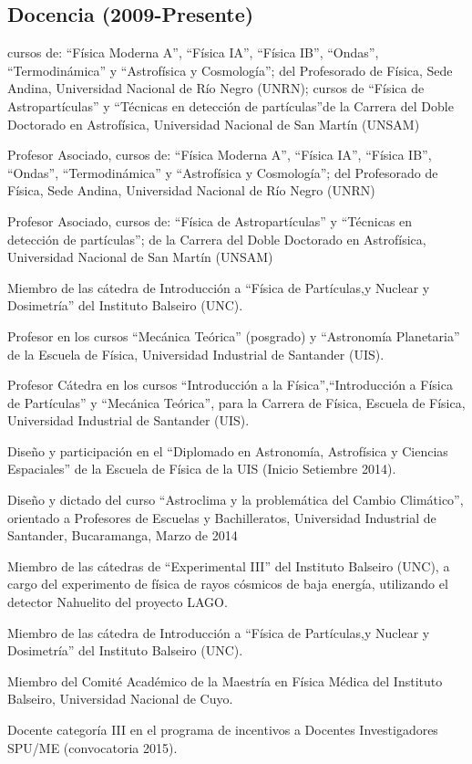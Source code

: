 \subsection*{Docencia (2009-Presente)}
\begin{description}
\ifres
	\item [Profesor Asociado] cursos de: ``Física Moderna A'', ``Física IA'', ``Física IB'', ``Ondas'', ``Termodinámica'' y ``Astrofísica y Cosmología''; del Profesorado de Física, Sede Andina, Universidad Nacional de Río Negro (UNRN); cursos de ``Física de Astropartículas'' y ``Técnicas en detección de partículas''de la Carrera del Doble Doctorado en Astrofísica, Universidad Nacional de San Martín (UNSAM)
\else
	\item [2015-presente] Profesor Asociado, cursos de: ``Física Moderna A'', ``Física IA'', ``Física IB'',  ``Ondas'', ``Termodinámica'' y ``Astrofísica y Cosmología''; del Profesorado de Física, Sede Andina, Universidad Nacional de Río Negro (UNRN)
	\item [2018-presente] Profesor Asociado, cursos de: ``Física de Astropartículas'' y ``Técnicas en detección de partículas''; de la Carrera del Doble Doctorado en Astrofísica, Universidad Nacional de San Martín (UNSAM)
 	\item [2015-2017] Miembro de las cátedra de Introducción a ``Física de Partículas,y Nuclear y Dosimetría'' del Instituto Balseiro (UNC).
	\item [2014-2015] Profesor en los cursos ``Mecánica Teórica'' (posgrado) y ``Astronomía Planetaria'' de la Escuela de Física, Universidad Industrial de Santander (UIS).
	\item [2013-2014] Profesor Cátedra en los cursos ``Introducción a la Física'',``Introducción a Física de Partículas'' y ``Mecánica Teórica'', para la Carrera de Física, Escuela de Física, Universidad Industrial de Santander (UIS).
	\item [2014] Diseño y participación en el ``Diplomado en Astronomía, Astrofísica y Ciencias Espaciales'' de la Escuela de Física de la UIS (Inicio Setiembre 2014).
	\item [2014] Diseño y dictado del curso ``Astroclima y la problemática del Cambio Climático'', orientado a Profesores de Escuelas y Bachilleratos, Universidad Industrial de Santander, Bucaramanga, Marzo de 2014
	\item [2010-2012] Miembro de las cátedras de ``Experimental III'' del Instituto Balseiro (UNC), a cargo del experimento de física de rayos cósmicos de baja energía, utilizando el detector Nahuelito del proyecto LAGO.
	\item [2010-2012] Miembro de las cátedra de Introducción a ``Física de Partículas,y Nuclear y Dosimetría'' del Instituto Balseiro (UNC).
	\item [2016-2020] Miembro del Comité Académico de la Maestría en Física Médica del Instituto Balseiro, Universidad Nacional de Cuyo.
	\item [2010-presente] Docente categoría III en el programa de incentivos a Docentes Investigadores SPU/ME (convocatoria 2015).
\fi
\end{description}
\fi